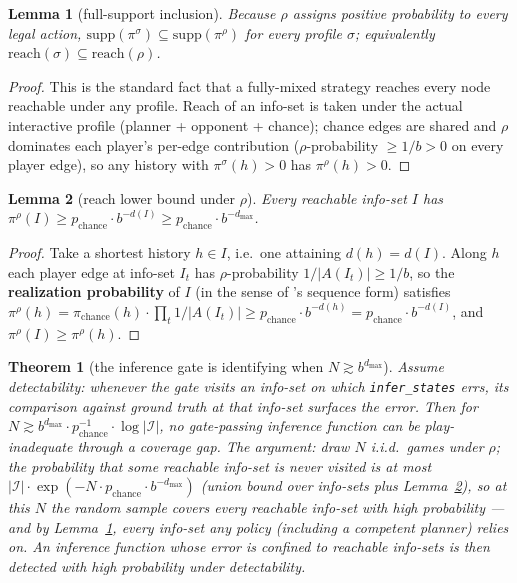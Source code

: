 \documentclass[11pt]{article}
\newtheorem{theorem}{Theorem}
\newtheorem{lemma}{Lemma}
\theoremstyle{remark}
\newcommand{\dmax}{d_{\max}}
\newcommand{\Ireach}{\mathcal{I}}
\begin{document}
\begin{lemma}[full-support inclusion]
\label{lem:fullsupport}
Because $\rho$ assigns positive probability to every legal action, $\mathrm{supp}(\pi^\sigma) \subseteq \mathrm{supp}(\pi^\rho)$ for every profile $\sigma$; equivalently $\mathrm{reach}(\sigma) \subseteq \mathrm{reach}(\rho)$.
\end{lemma}

\begin{proof}
This is the standard fact that a fully-mixed strategy reaches every node reachable under any profile. Reach of an info-set is taken under the actual interactive profile (planner + opponent + chance); chance edges are shared and $\rho$ dominates each player's per-edge contribution ($\rho$-probability $\geq 1/b > 0$ on every player edge), so any history with $\pi^\sigma(h) > 0$ has $\pi^\rho(h) > 0$.
\end{proof}

\begin{lemma}[reach lower bound under $\rho$]
\label{lem:reachbound}
Every reachable info-set $I$ has $\pi^\rho(I) \geq p_{\text{chance}} \cdot b^{-d(I)} \geq p_{\text{chance}} \cdot b^{-\dmax}$.
\end{lemma}

\begin{proof}
Take a shortest history $h \in I$, i.e.\ one attaining $d(h) = d(I)$. Along $h$ each player edge at info-set $I_t$ has $\rho$-probability $1/|A(I_t)| \geq 1/b$, so the \textbf{realization probability} of $I$ (in the sense of \citeauthor{vonstengel1996sequenceform}'s \citeyearpar{vonstengel1996sequenceform} sequence form) satisfies $\pi^\rho(h) = \pi_{\text{chance}}(h) \cdot \prod_t 1/|A(I_t)| \geq p_{\text{chance}} \cdot b^{-d(h)} = p_{\text{chance}} \cdot b^{-d(I)}$, and $\pi^\rho(I) \geq \pi^\rho(h)$.
\end{proof}

\begin{theorem}[the inference gate is identifying when $N \gtrsim b^{\dmax}$]
\label{thm:coverage}
Assume \emph{detectability}: whenever the gate visits an info-set on which \texttt{infer\_states} errs, its comparison against ground truth at that info-set surfaces the error. Then for $N \gtrsim b^{\dmax} \cdot p_{\text{chance}}^{-1} \cdot \log |\Ireach|$, no gate-passing inference function can be play-inadequate through a coverage gap. The argument: draw $N$ i.i.d.\ games under $\rho$; the probability that some reachable info-set is never visited is at most $|\Ireach| \cdot \exp(-N \cdot p_{\text{chance}} \cdot b^{-\dmax})$ (union bound over info-sets plus Lemma~\ref{lem:reachbound}), so at this $N$ the random sample covers every reachable info-set with high probability --- and by Lemma~\ref{lem:fullsupport}, every info-set any policy (including a competent planner) relies on. An inference function whose error is confined to reachable info-sets is then detected with high probability under detectability.
\end{theorem}
\end{document}
